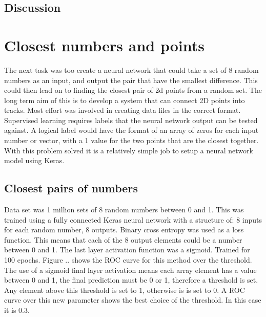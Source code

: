 \subsection{Discussion}


\section{Closest numbers and points} %
The next task was too create a neural network that could take a set of 8 random numbers as an input, and output the pair that have the smallest difference. This could then lead on to finding the closest pair of 2d points from a random set. The long term aim of this is to develop a system that can connect 2D points into tracks. 
Most effort was involved in creating data files in the correct format. Supervised learning requires labels that the neural network output can be tested against. A logical label would have the format of an array of zeros for each input number or vector, with a 1 value for the two points that are the closest together. With this problem solved it is a relatively simple job to setup a neural network model using Keras.

\subsection{Closest pairs of numbers}
Data set was 1 million sets of 8 random numbers between 0 and 1. This was trained using a fully connected Keras neural network with a structure of: 8 inputs for each random number, 8 outputs.
Binary cross entropy was used as a loss function. This means that each of the 8 output elements could be a number between 0 and 1. The last layer activation function was a sigmoid. Trained for 100 epochs. Figure .. shows the ROC curve for this method over the threshold. The use of a sigmoid final layer activation means each array element has a value between 0 and 1, the final prediction must be 0 or 1, therefore a threshold is set. Any element above this threshold is set to 1, otherwise is is set to 0. A ROC curve over this new parameter shows the best choice of the threshold. In this case it is 0.3.



